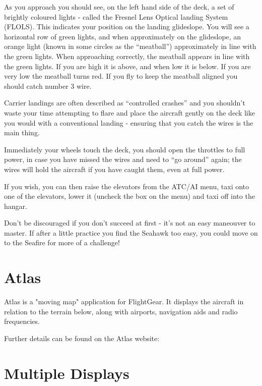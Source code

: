 As you approach you should see, on the left hand side of the deck, a set of brightly coloured lights - called
the Fresnel Lens Optical landing System (FLOLS). This indicates your position on the landing glideslope.
You will see a horizontal row of green lights, and when approximately on the glideslope, an orange light
(known in some circles as the ``meatball'') approximately in line with the green lights. When approaching
correctly, the meatball appears in line with the green lights. If you are high it is above, and when low
it is below. If you are very low the meatball turns red. If you fly to keep the meatball aligned you
should catch number 3 wire.

Carrier landings are often described as ``controlled crashes'' and you shouldn't waste your time attempting
to flare and place the aircraft gently on the deck like you would with a conventional landing - ensuring that
you catch the wires is the main thing.

Immediately your wheels touch the deck, you should open the throttles to full power, in case you have
missed the wires and need to ``go around'' again; the wires will hold the aircraft if you have caught them,
even at full power.

If you wish, you can then raise the elevators from the ATC/AI menu, taxi onto one of the elevators,
lower it (uncheck the box on the menu) and taxi off into the hangar.

Don't be discouraged if you don't succeed at first - it's not an easy maneouver to master. If after a little
practice you find the Seahawk too easy, you could move on to the Seafire for more of a challenge!


\section{Atlas\label{Atlas}}

Atlas is a "moving map" application for FlightGear. It displays the aircraft in relation to the terrain below,
along with airports, navigation aids and radio frequencies.

Further details can be found on the Atlas website:

\noindent
{}

\section{Multiple Displays}

